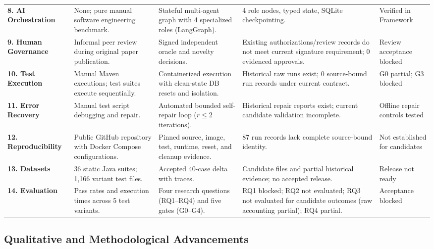 \documentclass[pdflatex,sn-mathphys-num]{sn-jnl}
\begin{document}
\begin{table}[t]
{\begin{tabular}{lp{4cm}p{4cm}p{4cm}p{3.5cm}}
\textbf{8. AI Orchestration} & None; pure manual software engineering benchmark. & Stateful multi-agent graph with 4 specialized roles (LangGraph). & 4 role nodes, typed state, SQLite checkpointing. & Verified in Framework \\
\textbf{9. Human Governance} & Informal peer review during original paper publication. & Signed independent oracle and novelty decisions. & Existing authorizations/review records do not meet current signature requirement; 0 evidenced approvals. & Review acceptance blocked \\
\textbf{10. Test Execution} & Manual Maven executions; test suites execute sequentially. & Containerized execution with clean-state DB resets and isolation. & Historical raw runs exist; 0 source-bound run records under current contract. & G0 partial; G3 blocked \\
\textbf{11. Error Recovery} & Manual test script debugging and repair. & Automated bounded self-repair loop ($r \le 2$ iterations). & Historical repair reports exist; current candidate validation incomplete. & Offline repair controls tested \\
\textbf{12. Reproducibility} & Public GitHub repository with Docker Compose configurations. & Pinned source, image, test, runtime, reset, and cleanup evidence. & 87 run records lack complete source-bound identity. & Not established for candidates \\
\textbf{13. Datasets} & 36 static Java suites; 1,166 variant test files. & Accepted 40-case delta with traces. & Candidate files and partial historical evidence; no accepted release. & Release not ready \\
\textbf{14. Evaluation} & Pass rates and execution times across 5 test variants. & Four research questions (RQ1--RQ4) and five gates (G0--G4). & RQ1 blocked; RQ2 not evaluated; RQ3 not evaluated for candidate outcomes (raw accounting partial); RQ4 partial. & Acceptance blocked \\
\bottomrule
\end{tabular}%
}
\end{table}

\subsection{Qualitative and Methodological Advancements}
\end{document}
